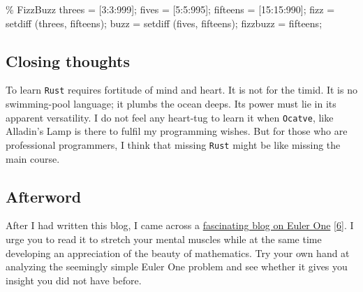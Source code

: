 \documentclass[
  a4paper,
]{article}
\newenvironment{Shaded}{\begin{snugshade}}{\end{snugshade}}
\newcommand{\CommentTok}[1]{\textcolor[rgb]{0.50,0.62,0.50}{#1}}
\newcommand{\FloatTok}[1]{\textcolor[rgb]{0.75,0.75,0.82}{#1}}
\newcommand{\FunctionTok}[1]{\textcolor[rgb]{0.94,0.94,0.56}{#1}}
\newcommand{\NormalTok}[1]{\textcolor[rgb]{0.80,0.80,0.80}{#1}}
\newcommand{\OperatorTok}[1]{\textcolor[rgb]{0.94,0.94,0.82}{#1}}
\begin{document}
\begin{Shaded}
\begin{Highlighting}[]
\CommentTok{\% FizzBuzz}
\NormalTok{threes }\OperatorTok{=}\NormalTok{ [}\FloatTok{3}\OperatorTok{:}\FloatTok{3}\OperatorTok{:}\FloatTok{999}\NormalTok{]}\OperatorTok{;}
\NormalTok{fives }\OperatorTok{=}\NormalTok{ [}\FloatTok{5}\OperatorTok{:}\FloatTok{5}\OperatorTok{:}\FloatTok{995}\NormalTok{]}\OperatorTok{;}
\NormalTok{fifteens }\OperatorTok{=}\NormalTok{ [}\FloatTok{15}\OperatorTok{:}\FloatTok{15}\OperatorTok{:}\FloatTok{990}\NormalTok{]}\OperatorTok{;}
\NormalTok{fizz }\OperatorTok{=} \FunctionTok{setdiff}\NormalTok{ (threes}\OperatorTok{,}\NormalTok{ fifteens)}\OperatorTok{;}
\NormalTok{buzz }\OperatorTok{=} \FunctionTok{setdiff}\NormalTok{ (fives}\OperatorTok{,}\NormalTok{ fifteens)}\OperatorTok{;}
\NormalTok{fizzbuzz }\OperatorTok{=}\NormalTok{ fifteens}\OperatorTok{;}
\end{Highlighting}
\end{Shaded}

\hypertarget{closing-thoughts}{%
\subsection{Closing thoughts}\label{closing-thoughts}}

To learn \texttt{Rust} requires fortitude of mind and heart. It is not
for the timid. It is no swimming-pool language; it plumbs the ocean
deeps. Its power must lie in its apparent versatility. I do not feel any
heart-tug to learn it when \texttt{Ocatve}, like Alladin's Lamp is there
to fulfil my programming wishes. But for those who are professional
programmers, I think that missing \texttt{Rust} might be like missing
the main course.

\hypertarget{afterword}{%
\subsection{Afterword}\label{afterword}}

After I had written this blog, I came across a
\href{https://iambryanhaney.medium.com/another-unreasonable-deep-dive-into-project-euler-problem-1-51a3a841ad67\#:~:text=The\%20Problem,0\%20modulo\%203\%20or\%205}{fascinating
blog on Euler One} {[}\protect\hyperlink{ref-haney2020}{6}{]}. I urge
you to read it to stretch your mental muscles while at the same time
developing an appreciation of the beauty of mathematics. Try your own
hand at analyzing the seemingly simple Euler One problem and see whether
it gives you insight you did not have before.
\end{document}

